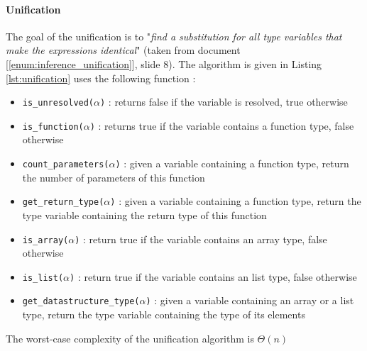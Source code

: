 \documentclass[a4paper,11pt]{article}
\begin{document}
\paragraph{Unification} The goal of the unification is to "\textit{find a substitution for all type variables that make the expressions identical}" (taken from document [\ref{enum:inference_unification}], slide 8). The algorithm is given in Listing \ref{lst:unification} uses the following function :

\begin{itemize}
	\item \texttt{is\_unresolved($\alpha$)} : returns false if the variable is resolved, true otherwise
	\item \texttt{is\_function($\alpha$)} : returns true if the variable contains a function type, false otherwise
	\item \texttt{count\_parameters($\alpha$)} : given a variable containing a function type, return the number of parameters of this function
	\item \texttt{get\_return\_type($\alpha$)} : given a variable containing a function type, return the type variable containing the return type of this function
	\item \texttt{is\_array($\alpha$)} : return true if the variable contains an array type, false otherwise
	\item \texttt{is\_list($\alpha$)} : return true if the variable contains an list type, false otherwise
	\item \texttt{get\_datastructure\_type($\alpha$)} : given a variable containing an array or a list type, return the type variable containing the type of its elements
\end{itemize}
The worst-case complexity of the unification algorithm is $\Theta(n)$
\end{document}
